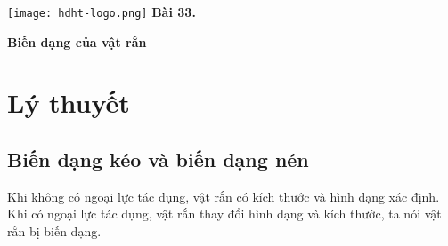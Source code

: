 \newcommand{\chapter}[2][]{
	\newcommand{\chapname}{#2}
	\begin{flushleft}
		\begin{minipage}[t]{\linewidth}
			\texttt{[image: hdht-logo.png]}
			\hspace{0pt}	
			\sffamily\bfseries\large Bài  33.
			\begin{flushleft}
				\huge\bfseries #1
			\end{flushleft}
		\end{minipage}
	\end{flushleft}
	\vspace{1cm}
	\normalfont\normalsize
}
\chapter[Biến dạng của vật rắn]{Biến dạng của vật rắn}
\section{Lý thuyết}
\subsection{Biến dạng kéo và biến dạng nén}
Khi không có ngoại lực tác dụng, vật rắn có kích thước và hình dạng xác định. Khi có ngoại lực tác dụng, vật rắn thay đổi hình dạng và kích thước, ta nói vật rắn bị biến dạng.

